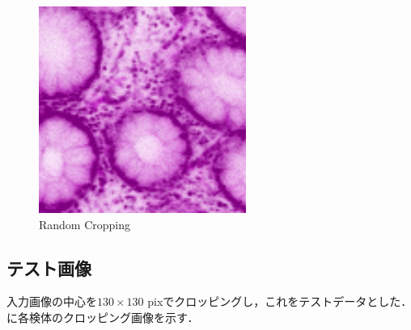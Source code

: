 \begin{figure}[H]
\begin{minipage}{0.25\columnwidth}
	\end{minipage}
	\begin{minipage}{0.25\columnwidth}
		\centering
		\includegraphics[clip, width=\linewidth]{fig/preprocessing/data_aug/random_crop/x34_y34}
	\end{minipage}	
	
	\caption{Random Cropping}
	\label{fig:ランダムクロッピング}
	
\end{figure}

\subsection{テスト画像}
入力画像の中心を$130\times 130$ pixでクロッピングし，これをテストデータとした．に各検体のクロッピング画像を示す．

